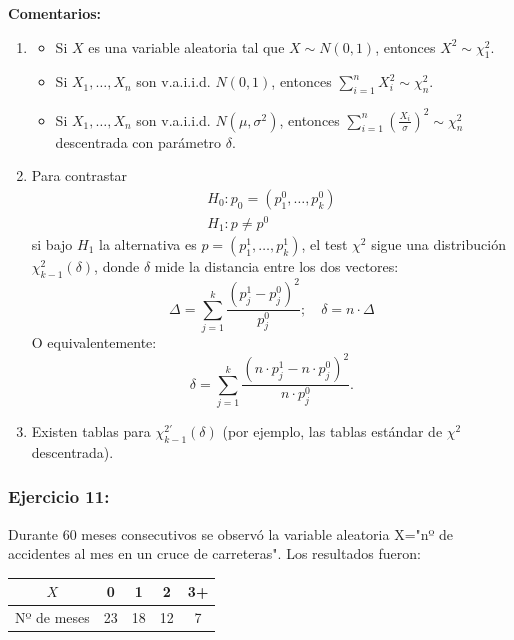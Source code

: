 \textbf{Comentarios:} %
\begin{enumerate}
    \item   \begin{itemize}
        \item Si $X$ es una variable aleatoria tal que $X \sim N(0,1)$, entonces $X^2 \sim \chi^2_1$.
        \item Si $X_1, \dots, X_n$ son v.a.i.i.d. $N(0,1)$, entonces $\sum_{i=1}^{n} X_i^2 \sim \chi^2_n$.
        \item Si $X_1, \dots, X_n$ son v.a.i.i.d. $N(\mu, \sigma^2)$, entonces 
        $
        \sum_{i=1}^{n} \left( \frac{X_i}{\sigma} \right)^2 \sim \chi^2_n
        $
        descentrada con parámetro $\delta$.
    \end{itemize}
    \item Para contrastar 
    \[
    \begin{matrix}
        H_0: p_0 = (p_1^0, \dots, p_k^0) \\
        H_1: p \neq p^0
    \end{matrix}
    \]
    si bajo $H_1$ la alternativa 
    es $p = (p_1^1, \dots, p_k^1)$, el test $\chi^2$ sigue 
    una distribución $\chi^2_{k-1}(\delta)$, donde $\delta$ 
    mide la distancia entre los dos vectores:
    \[
    \Delta = \sum_{j=1}^{k} \frac{(p_j^1 - p_j^0)^2}{p_j^0}; \quad \delta = n \cdot \Delta
    \]
    O equivalentemente:
    \[
    \delta = \sum_{j=1}^{k} \frac{\left( n \cdot p_j^1 - n \cdot p_j^0 \right)^2}{n \cdot p_j^0}.
    \]
    \item Existen tablas para $\chi_{k-1}^{2'}(\delta)$ (por ejemplo, las tablas estándar de $\chi^2$ descentrada).
\end{enumerate}

\subsubsection*{Ejercicio 11:}  
Durante 60 meses consecutivos se observó la variable aleatoria X="nº de accidentes al mes en un cruce de carreteras". Los resultados fueron:

\begin{table}[!h]
    \centering
    \begin{tabular}{|c|c|c|c|c|}
        \hline
        {$X$} & 0 & 1 & 2 & 3+ \\ \hline
        {Nº de meses} & 23 & 18 & 12 & 7 \\ \hline
    \end{tabular}
\end{table}

